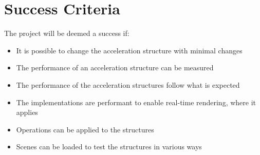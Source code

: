 \section*{Success Criteria}

The project will be deemed a success if:
\begin{itemize}
  \item It is possible to change the acceleration structure with minimal changes
  \item The performance of an acceleration structure can be measured
  \item The performance of the acceleration structures follow what is expected
  \item The implementations are performant to enable real-time rendering, where
    it applies
  \item Operations can be applied to the structures
  \item Scenes can be loaded to test the structures in various ways
\end{itemize}
